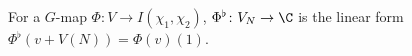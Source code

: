 For a $G$-map $\Phi\colon V\to I(\chi_1,\chi_2)$, $\Phi^\flat\colon V_N\to\C$ is the linear form $\Phi^\flat(v+V(N))=\Phi(v)(1)$.
